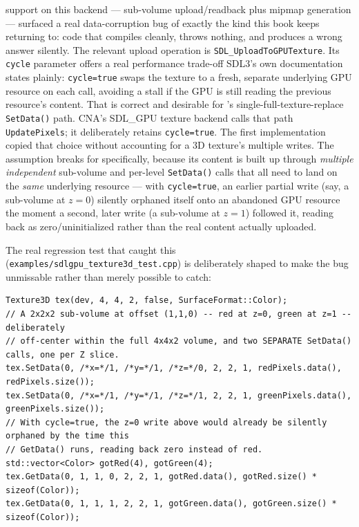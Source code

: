  support on this backend --- sub-volume upload/readback plus mipmap generation
--- surfaced a real data-corruption bug of exactly the kind this book keeps returning to: code that compiles cleanly, throws
nothing, and produces a wrong answer silently. The relevant upload operation is
\texttt{SDL\_UploadToGPUTexture}. Its \texttt{cycle} parameter offers a real performance
trade-off SDL3's own documentation states plainly: \texttt{cycle=true} swaps the texture to a
fresh, separate underlying GPU resource on each call, avoiding a stall if the GPU is still
reading the previous resource's content. That is correct and desirable for 's
single-full-texture-replace \texttt{SetData()} path. CNA's SDL\_GPU texture backend calls that
path \texttt{UpdatePixels}; it deliberately retains \texttt{cycle=true}. The first
 implementation copied that choice without accounting for a 3D texture's
multiple writes.
The assumption breaks for  specifically, because its content is built up
through \emph{multiple independent} sub-volume and per-level \texttt{SetData()} calls that all
need to land on the \emph{same} underlying resource --- with \texttt{cycle=true}, an earlier
partial write (say, a sub-volume at $z=0$) silently orphaned itself onto an abandoned GPU
resource the moment a second, later write (a sub-volume at $z=1$) followed it, reading back as
zero/uninitialized rather than the real content actually uploaded.

The real regression test that caught this (\texttt{examples/sdlgpu\_texture3d\_test.cpp})
is deliberately shaped to make the bug unmissable rather than merely possible to catch:

\begin{lstlisting}
Texture3D tex(dev, 4, 4, 2, false, SurfaceFormat::Color);
// A 2x2x2 sub-volume at offset (1,1,0) -- red at z=0, green at z=1 -- deliberately
// off-center within the full 4x4x2 volume, and two SEPARATE SetData() calls, one per Z slice.
tex.SetData(0, /*x=*/1, /*y=*/1, /*z=*/0, 2, 2, 1, redPixels.data(), redPixels.size());
tex.SetData(0, /*x=*/1, /*y=*/1, /*z=*/1, 2, 2, 1, greenPixels.data(), greenPixels.size());
// With cycle=true, the z=0 write above would already be silently orphaned by the time this
// GetData() runs, reading back zero instead of red.
std::vector<Color> gotRed(4), gotGreen(4);
tex.GetData(0, 1, 1, 0, 2, 2, 1, gotRed.data(), gotRed.size() * sizeof(Color));
tex.GetData(0, 1, 1, 1, 2, 2, 1, gotGreen.data(), gotGreen.size() * sizeof(Color));
\end{lstlisting}


